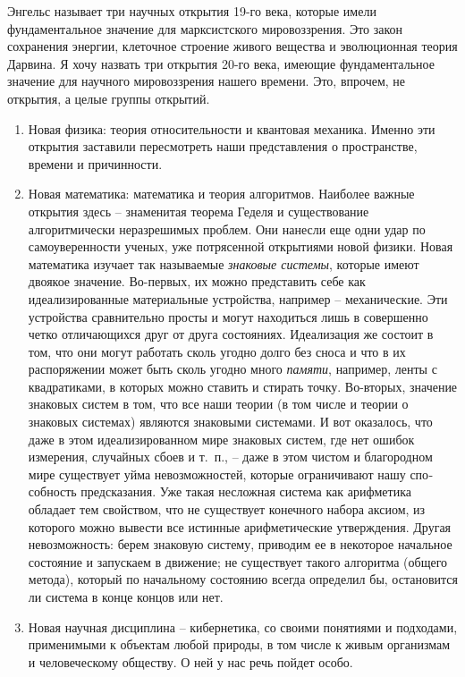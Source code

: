 \documentclass{book}
\begin{document}
Энгельс называет три научных открытия 19-го века, которые имели фундаментальное значение для марксистского мировоззрения. Это закон сохранения энергии, клеточное строение живого вещества и эволюционная теория Дарвина. Я хочу назвать три открытия 20-го века, имеющие фундаментальное значение для научного мировоззрения нашего времени. Это, впрочем, не открытия, а целые группы открытий.
\begin{enumerate}
 \item Новая физика: теория относительности и квантовая механика. Именно эти открытия заставили пересмотреть наши представления о пространстве, времени и причинности.
 \item Новая математика: математика и теория алгоритмов. Наиболее важные открытия здесь -- знаменитая теорема Геделя и существование алгоритмически неразрешимых проблем. Они нанесли еще одни удар по самоуверенности ученых, уже потрясенной открытиями новой физики. Новая математика изучает так называемые \textit{знаковые системы},  которые имеют двоякое значение. Во-первых, их можно представить себе как идеализированные материальные устройства, например -- механи­ческие. Эти устройства сравнительно просты и могут находить­ся лишь в совершенно четко отличающихся друг от друга состояниях. Идеализация же состоит в том, что они могут работать сколь угодно долго без сноса и что в их распоряжении может быть сколь угодно много \textit{памяти},  например, ленты с квадрати­ками, в которых можно ставить и стирать точку. Во-вторых, значение знаковых систем в том, что все наши теории (в том числе и теории о знаковых системах) являются знаковыми системами. И вот оказалось, что даже в этом идеализированном мире знаковых 
систем, где нет 
ошибок измерения, случайных сбоев и т.~п., -- даже в этом чистом и благородном мире сущест­вует уйма невозможностей, которые ограничивают нашу спо­собность предсказания. Уже такая несложная система как ариф­метика обладает тем свойством, что не существует конечного набора аксиом, из которого можно вывести все истинные арифметические утверждения. Другая невозможность: берем знако­вую систему, приводим ее в некоторое начальное состояние и запускаем в движение; не существует такого алгоритма (об­щего метода), который по начальному состоянию всегда опре­делил бы, остановится ли система в конце концов или нет.
 \item Новая научная дисциплина -- кибернетика, со своими поня­тиями и подходами, применимыми к объектам любой природы, в том числе к живым организмам и человеческому обществу. О ней у нас речь пойдет особо.
\end{enumerate}
\end{document}
